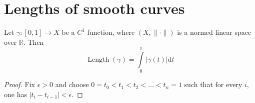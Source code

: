 \section{Lengths of smooth curves}

\begin{thm}
  Let $\gamma: \left[0, 1 \right] \to X$ be a $C^1$ function, where $(X,\|\cdot\|)$ is a normed linear space over $\mathbb{R}$. Then
  \begin{equation*}
    \operatorname{Length}(\gamma)= \int\limits_{0}^{1} \left|\dot{\gamma}(t)\right| \mathrm{d}t
  \end{equation*}
\end{thm}

\begin{proof}
  Fix $\epsilon > 0$ and choose $0 = t_0 < t_1 < t_2 < \ldots < t_n = 1$ such that for every $i$, one has $\left|t_i-t_{i-1}\right| < \epsilon$.
\end{proof}
